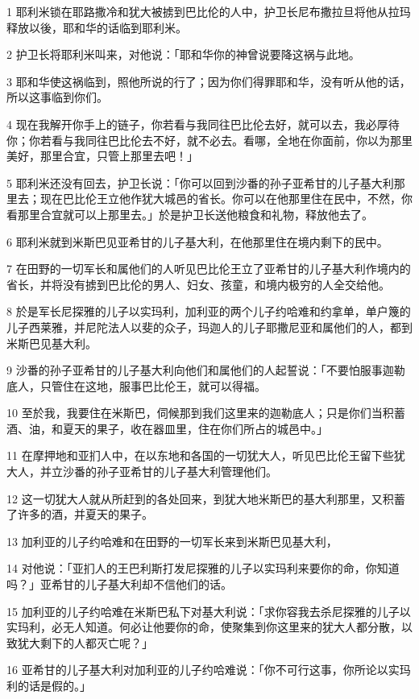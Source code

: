 \par 1 耶利米锁在耶路撒冷和犹大被掳到巴比伦的人中，护卫长尼布撒拉旦将他从拉玛释放以後，耶和华的话临到耶利米。
\par 2 护卫长将耶利米叫来，对他说：「耶和华你的神曾说要降这祸与此地。
\par 3 耶和华使这祸临到，照他所说的行了；因为你们得罪耶和华，没有听从他的话，所以这事临到你们。
\par 4 现在我解开你手上的链子，你若看与我同往巴比伦去好，就可以去，我必厚待你；你若看与我同往巴比伦去不好，就不必去。看哪，全地在你面前，你以为那里美好，那里合宜，只管上那里去吧！」
\par 5 耶利米还没有回去，护卫长说：「你可以回到沙番的孙子亚希甘的儿子基大利那里去；现在巴比伦王立他作犹大城邑的省长。你可以在他那里住在民中，不然，你看那里合宜就可以上那里去。」於是护卫长送他粮食和礼物，释放他去了。
\par 6 耶利米就到米斯巴见亚希甘的儿子基大利，在他那里住在境内剩下的民中。
\par 7 在田野的一切军长和属他们的人听见巴比伦王立了亚希甘的儿子基大利作境内的省长，并将没有掳到巴比伦的男人、妇女、孩童，和境内极穷的人全交给他。
\par 8 於是军长尼探雅的儿子以实玛利，加利亚的两个儿子约哈难和约拿单，单户篾的儿子西莱雅，并尼陀法人以斐的众子，玛迦人的儿子耶撒尼亚和属他们的人，都到米斯巴见基大利。
\par 9 沙番的孙子亚希甘的儿子基大利向他们和属他们的人起誓说：「不要怕服事迦勒底人，只管住在这地，服事巴比伦王，就可以得福。
\par 10 至於我，我要住在米斯巴，伺候那到我们这里来的迦勒底人；只是你们当积蓄酒、油，和夏天的果子，收在器皿里，住在你们所占的城邑中。」
\par 11 在摩押地和亚扪人中，在以东地和各国的一切犹大人，听见巴比伦王留下些犹大人，并立沙番的孙子亚希甘的儿子基大利管理他们。
\par 12 这一切犹大人就从所赶到的各处回来，到犹大地米斯巴的基大利那里，又积蓄了许多的酒，并夏天的果子。
\par 13 加利亚的儿子约哈难和在田野的一切军长来到米斯巴见基大利，
\par 14 对他说：「亚扪人的王巴利斯打发尼探雅的儿子以实玛利来要你的命，你知道吗？」亚希甘的儿子基大利却不信他们的话。
\par 15 加利亚的儿子约哈难在米斯巴私下对基大利说：「求你容我去杀尼探雅的儿子以实玛利，必无人知道。何必让他要你的命，使聚集到你这里来的犹大人都分散，以致犹大剩下的人都灭亡呢？」
\par 16 亚希甘的儿子基大利对加利亚的儿子约哈难说：「你不可行这事，你所论以实玛利的话是假的。」

